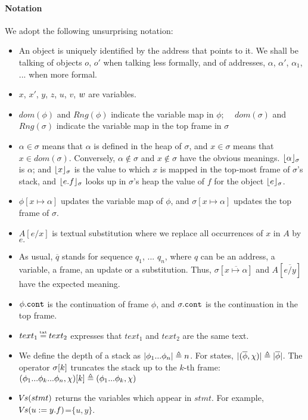  
 
\paragraph{Notation} We adopt the following unsurprising notation:
\label{s:notation}
\begin{itemize}
\item
{An object is uniquely identified by the address that points to it. We shall be talking of objects $o$, $o'$ when talking less formally, and of addresses, $\alpha$, $\alpha'$, $\alpha_1$, ...  when more formal.}
\item
$x$, $x'$, $y$, $z$, $u$, $v$, $w$  are {variables}. 
\item
$dom(\phi)$ and $Rng(\phi)$ indicate the variable map in $\phi$; \ \ $dom(\sigma)$ and $Rng(\sigma)$ indicate the variable map in the top frame in $\sigma$
\item
$\alpha \in \sigma$ means that $\alpha$ is defined in the heap of $\sigma$, and $x\in \sigma$ means that $x\in dom(\sigma)$.
Conversely,  $\alpha\notin\sigma$ and $x\notin\sigma$ %
 have the obvious meanings.
$\lfloor \alpha \rfloor_{\sigma}$  is $\alpha$; and $\lfloor x \rfloor_{\sigma}$  is the value to which  $x$  is mapped in the top-most frame of $\sigma$'s stack, 
and $\lfloor e.f \rfloor_{\sigma}$ looks up in $\sigma$'s heap the value of $f$ for the object  $\lfloor e \rfloor_{\sigma}$.
\item %
$\phi[x \mapsto \alpha]$ updates  the variable map  of $\phi$,  
and  $\sigma[x \mapsto \alpha]$ updates the top frame of $\sigma$.
\item
$A[e/x]$ is textual substitution where we replace all occurrences of $x$ in $A$ by $e.$ 
\item
As usual, $\overline q$ stands for  sequence $q_1$, ... $q_n$, where $q$ can be an address, a variable,    a frame, an update or a substitution.
Thus,   $\sigma[\overline{x \mapsto \alpha}]$ and $A[ \overline{e/y}]$ 
have the expected meaning.
\item
$\phi.\mbox{\normalfont{\texttt{cont}}}$ is the continuation of frame $\phi$, and  $\sigma.\mbox{\normalfont{\texttt{cont}}}$ is the continuation in the top frame.
\item
$text_1 \txteq text_2$ expresses that $text_1$ and $text_2$ are  the same text.%
\item
We define the depth of a stack as $|\phi_1...\phi_n| \triangleq n$. For states, $|(\overline \phi, \chi)| \triangleq  |\overline \phi|$.
The  operator $\sigma[k]$ truncates the stack up to the $k$-th frame: %
 $(\phi_1...\phi_k...\phi_n,\chi)[k]  \triangleq   (\phi_1...\phi_k,\chi)$
\item
{ ${\hspace{-1pt}V\hspace{-1pt}}s(stmt)$ returns the variables which appear in $stmt$. For example, ${\hspace{-1pt}V\hspace{-1pt}}s(u:=y.f)$=$\{u,y\}$.}
\end{itemize}

